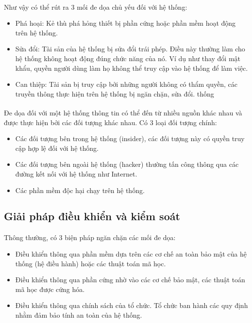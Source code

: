 \paragraph{}
Như vậy có thể rút ra 3 mối đe dọa chủ yếu đối với hệ thống:

\begin{itemize}
    \item Phá hoại: Kẻ thù phá hỏng thiết bị phần cứng hoặc phần mềm hoạt động trên hệ thống.
    \item Sửa đổi: Tài sản của hệ thống bị sửa đổi trái phép. Điều này thường làm cho hệ thống không hoạt động đúng chức năng của nó. Ví dụ như thay đổi mật khẩu, quyền người dùng làm họ không thể truy cập vào hệ thống để làm việc.
    \item Can thiệp: Tài sản bị truy cập bởi những người không có thẩm quyền, các truyền thông thực hiện trên hệ thống bị ngăn chặn, sửa đổi.
thống
\end{itemize}

\paragraph{}
Đe dọa đối với một hệ thống thông tin có thể đến từ nhiều nguồn khác nhau và được thực hiện bởi các đối tượng khác nhau. Có 3 loại đối tượng chính:
\begin{itemize}
	\item Các đối tượng bên trong hệ thống (insider), các đối tượng này có quyền truy cập hợp lệ đối với hệ thống.
	\item Các đối tượng bên ngoài hệ thống (hacker) thường tấn công thông qua các đường kết nối với hệ thống như Internet.
	\item Các phần mềm độc hại chạy trên hệ thống.
\end{itemize}


\subsection{Giải pháp điều khiển và kiểm soát}

\paragraph{}
Thông thường, có 3 biện pháp ngăn chặn các mối đe dọa:

\begin{itemize}
	\item Điều khiển thông qua phần mềm dựa trên các cơ chế an toàn bảo mật của hệ thống (hệ điều hành) hoặc các thuật toán mã học.
	\item Điều khiển thông qua phần cứng nhờ vào các cơ chế bảo mật, các thuật toán mã học được cứng hóa.
	\item Điều khiển thông qua chính sách của tổ chức. Tổ chức ban hành các quy định nhằm đảm bảo tính an toàn của hệ thống.
\end{itemize}

